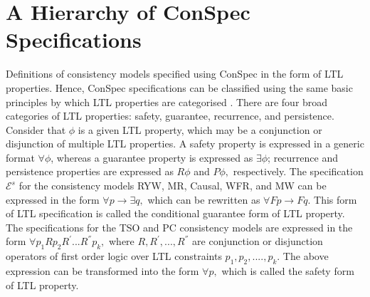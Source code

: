 \documentclass{sig-alternate-05-2015}
\begin{document}
\section{A Hierarchy of ConSpec Specifications }
Definitions of consistency models specified using ConSpec in the form of LTL properties. Hence, ConSpec specifications can be classified using the same basic principles by which LTL properties are categorised \cite{Manna:1990:HTP:93385.93442}. There are four broad categories of  LTL properties: safety, guarantee, recurrence, and persistence. Consider that $\phi$ is a given LTL property, which may be a conjunction or disjunction of multiple LTL properties. A safety property is expressed in a generic format $\forall \phi$, whereas a guarantee property is expressed as $\exists \phi$; recurrence and persistence properties are expressed as $R \phi$ and $P \phi,$ respectively.  The specification $\mathcal{E}^{s} $  for the consistency models RYW, MR, Causal, WFR, and MW can be expressed in the form $\forall p \rightarrow \exists q, $ which can be rewritten as $\forall F p \rightarrow F q.$ This form of LTL specification is called the conditional guarantee form of LTL property. The specifications for the TSO and PC consistency models are expressed in the form  $\forall p_1 R  p_2 R^{'}  ... R^{''}  p_k, $  where $R, R^{'}, ... , R^{''}$ are conjunction or disjunction operators of first order logic over LTL constraints $p_1, p_2, .... , p_k$. The above expression can be transformed into the form $\forall p,$ which is called the safety form of LTL property. 
\end{document}
